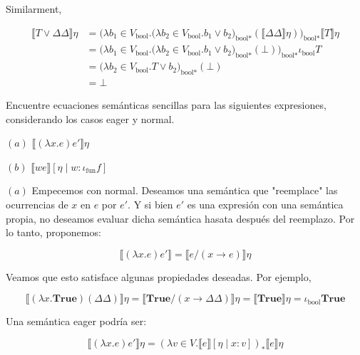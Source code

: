 \documentclass[article, 12pt]{article}
\begin{document}
Similarment,

\begin{align*}
\llbracket T \lor \Delta\Delta \rrbracket\eta
&= \Big(\lambda b_1 \in V_{\text{bool}}.\big( \lambda b_2 \in V_{\text{bool}}. b_1 \lor
b_2 \big)_{\text{bool}*}(\llbracket \Delta\Delta \rrbracket\eta)
\Big)_{\text{bool}*}\llbracket T \rrbracket\eta \\ 
&= \Big(\lambda b_1 \in V_{\text{bool}}.\big( \lambda b_2 \in V_{\text{bool}}. b_1 \lor
    b_2 \big)_{\text{bool}*}(\bot )
\Big)_{\text{bool}*} \iota_{\text{bool}} T \\ 
&= \big( \lambda b_2 \in V_{\text{bool}}. T \lor
    b_2 \big)_{\text{bool}*}(\bot ) \\ 
&= \bot 
\end{align*}

\pagebreak 


\begin{myframe}
    Encuentre ecuaciones semánticas sencillas para las siguientes expresiones,
    considerando los casos eager y normal. 

    $(a)$ $\llbracket (\lambda x. e)e' \rrbracket\eta$

    $(b)$ $\llbracket we \rrbracket[\eta \mid w : \iota_{\text{fun}} f]$
\end{myframe}


$(a)$ Empecemos con normal. Deseamos una semántica que "reemplace" las ocurrencias
de $x$ en $e$ por $e'$. Y si bien $e'$ es una expresión con una semántica
propia, no deseamos evaluar dicha semántica hasata después del reemplazo. Por lo
tanto, proponemos:

\begin{equation*}
    \llbracket (\lambda x.e)e' \rrbracket = \llbracket e / (x \to e)
    \rrbracket\eta
\end{equation*}

Veamos que esto satisface algunas propiedades deseadas. Por ejemplo, 

\begin{equation*}
   \llbracket (\lambda x.\textbf{True})( \Delta\Delta ) \rrbracket\eta =
   \llbracket \textbf{True} / (x \to \Delta\Delta) \rrbracket\eta = \llbracket
   \textbf{True} \rrbracket\eta = \iota_{\text{bool}} \textbf{True}
\end{equation*}

Una semántica eager podría ser:

\begin{equation*}
    \llbracket (\lambda x.e)e' \rrbracket\eta = (\lambda v \in V. \llbracket e
    \rrbracket[\eta \mid x : v] )_{*}\llbracket e
    \rrbracket\eta
\end{equation*}
\end{document}
